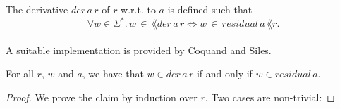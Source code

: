 
    \begin{definition}{}
        \label{derivative}
        The derivative $der \,  a \, r$ of $r$ w.r.t. to $a$ is defined such that 
        \begin{equation*}       \forall w \in \Sigma^*. \, w \, \in \, \lang{der \, a \, r} \Leftrightarrow w \, \in \, residual \, a \, \lang{r}. \end{equation*}
        \end{definition}

        \paragraph{}
        A suitable implementation is provided by Coquand and Siles.



        \begin{theorem}
            \label{der_correct}
            For all $r$, $w$ and $a$, we have that $w \in der \, a \, r$ if and only if $w \in residual \, a $.
        \end{theorem}

        \begin{proof}
            We prove the claim by induction over $r$. Two cases are non-trivial: 
        \end{proof}

